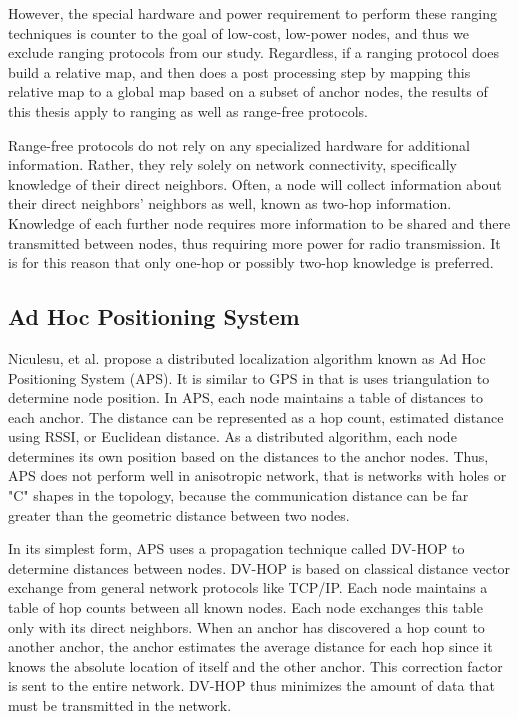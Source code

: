 However, the special hardware and power requirement to perform these ranging techniques is counter to the goal of low-cost, low-power nodes, and thus we exclude ranging protocols from our study.  Regardless, if a ranging protocol does build a relative map, and then does a post processing step by mapping this relative map to a global map based on a subset of anchor nodes, the results of this thesis apply to ranging as well as range-free protocols.

Range-free protocols do not rely on any specialized hardware for additional information.  Rather, they rely solely on network connectivity, specifically knowledge of their direct neighbors.  Often, a node will collect information about their direct neighbors' neighbors as well, known as two-hop information.  Knowledge of each further node requires more information to be shared and there transmitted between nodes, thus requiring more power for radio transmission.  It is for this reason that only one-hop or possibly two-hop knowledge is preferred.

\subsection{Ad Hoc Positioning System}
Niculesu, et al. propose a distributed localization algorithm known as Ad Hoc Positioning System (APS)\cite{APS}.  It is similar to GPS in that is uses triangulation to determine node position.  In APS, each node maintains a table of distances to each anchor.  The distance can be represented as a hop count, estimated distance using RSSI, or Euclidean distance.  As a distributed algorithm, each node determines its own position based on the distances to the anchor nodes.  Thus, APS does not perform well in anisotropic network, that is networks with holes or "C" shapes in the topology, because the communication distance can be far greater than the geometric distance between two nodes.

In its simplest form, APS uses a propagation technique called DV-HOP to determine distances between nodes.  DV-HOP is based on classical distance vector exchange from general network protocols like TCP/IP.  Each node maintains a table of hop counts between all known nodes.  Each node exchanges this table only with its direct neighbors.  When an anchor has discovered a hop count to another anchor, the anchor estimates the average distance for each hop since it knows the absolute location of itself and the other anchor. 
This correction factor is sent to the entire network.  DV-HOP thus minimizes the amount of data that must be transmitted in the network.  

